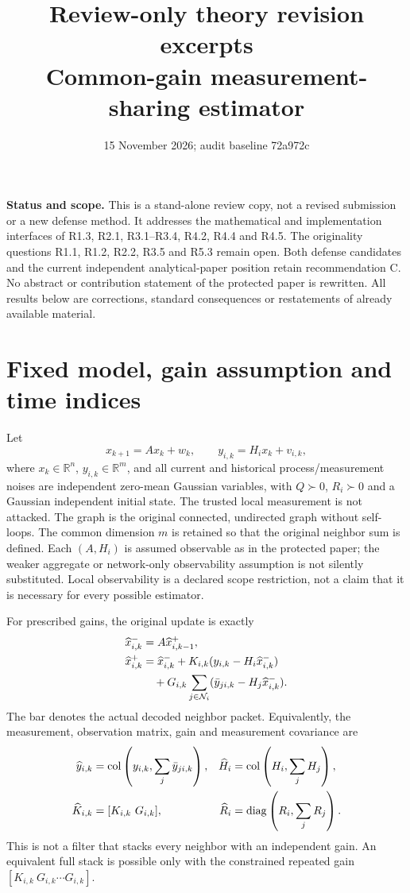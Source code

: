 \documentclass[11pt,a4paper]{article}
\title{Review-only theory revision excerpts\\Common-gain measurement-sharing estimator}
\author{}
\date{15 November 2026; audit baseline 72a972c}
\DeclareMathOperator{\col}{col}
\newcommand{\R}{\mathbb R}
\begin{document}
\maketitle
\noindent\textbf{Status and scope.}
This is a stand-alone review copy, not a revised submission or a new
defense method. It addresses the mathematical and implementation interfaces
of R1.3, R2.1, R3.1--R3.4, R4.2, R4.4 and R4.5.
The originality questions R1.1, R1.2, R2.2, R3.5 and R5.3 remain open.
Both defense candidates and the current independent analytical-paper
position retain recommendation C. No abstract or contribution statement
of the protected paper is rewritten. All results below are corrections,
standard consequences or restatements of already available material.

\section{Fixed model, gain assumption and time indices}
\label{rev:model}
Let
\[
 x_{k+1}=Ax_k+w_k,\qquad y_{i,k}=H_ix_k+v_{i,k},
\]
where $x_k\in\R^n$, $y_{i,k}\in\R^m$, and all current and historical
process/measurement noises are independent zero-mean Gaussian variables,
with $Q\succ0$, $R_i\succ0$ and a Gaussian independent initial state.
The trusted local measurement is not attacked. The graph is the original
connected, undirected graph without self-loops. The common dimension $m$
is retained so that the original neighbor sum is defined.
Each $(A,H_i)$ is assumed observable as in the protected paper; the
weaker aggregate or network-only observability assumption is not
silently substituted. Local observability is a declared scope restriction,
not a claim that it is necessary for every possible estimator.

For prescribed gains, the original update is exactly
\begin{align}
 \widehat x_{i,k}^{-}&=A\widehat x_{i,k-1}^{+},\label{rev:prediction}\\
 \widehat x_{i,k}^{+}&=\widehat x_{i,k}^{-}
 +K_{i,k}(y_{i,k}-H_i\widehat x_{i,k}^{-})\notag\\
 &\quad+G_{i,k}\sum_{j\in\mathcal N_i}
       (\bar y_{ji,k}-H_j\widehat x_{i,k}^{-}).\label{rev:commonG}
\end{align}
The bar denotes the actual decoded neighbor packet. Equivalently, the
measurement, observation matrix, gain and measurement covariance are
\begin{align}
 \widehat y_{i,k}&=\col\left(y_{i,k},\sum_j\bar y_{ji,k}\right),&
 \widehat H_i&=\col\left(H_i,\sum_j H_j\right),\notag\\
 \widehat K_{i,k}&=[K_{i,k}\ G_{i,k}],&
 \widehat R_i&=\operatorname{diag}\left(R_i,\sum_jR_j\right).
 \label{rev:aggregate}
\end{align}
This is not a filter that stacks every neighbor with an independent gain.
An equivalent full stack is possible only with the constrained repeated
gain $[K_{i,k}\ G_{i,k}\cdots G_{i,k}]$.
\end{document}
